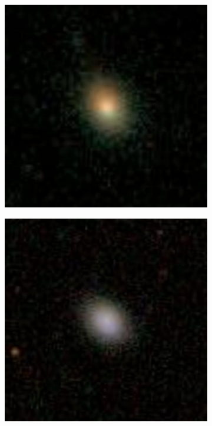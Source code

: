 \documentclass[12pt, onecolumn]{aa}
\begin{document}
\begin{figure}[h]
\begin{subfigure}[t]{0.23\linewidth}
    \caption{}
    \label{fig:correct_2}
    \end{subfigure}
    \begin{subfigure}[t]{0.23\linewidth}
    \centering
    \includegraphics[width=\linewidth]{Figures/Correctly_Classified/Elliptical/157610.jpg}
    \caption{}
    \label{fig:correct_3}
    \end{subfigure}
    \begin{subfigure}[t]{0.23\linewidth}
    \centering
    \includegraphics[width=\linewidth]{Figures/Correctly_Classified/Elliptical/110768.jpg}
    \caption{}
    \label{fig:correct_4}
    \end{subfigure}
    

\end{figure}
\end{document}
